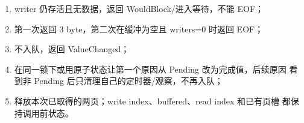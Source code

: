 \begin{answerbox}
\begin{enumerate}[leftmargin=2.2em]
  \item writer 仍存活且无数据，返回 WouldBlock/进入等待，不能 EOF；
  \item 第一次返回 3 byte，第二次在缓冲为空且 writers=0 时返回 EOF；
  \item 不入队，返回 ValueChanged；
  \item 在同一锁下或用原子状态让第一个原因从 Pending 改为完成值，后续原因
    看到非 Pending 后只清理自己的定时器/观察，不再入队；
  \item 释放本次已取得的两页；write index、buffered、read index 和已有页槽
    都保持调用前状态。
\end{enumerate}
\end{answerbox}
